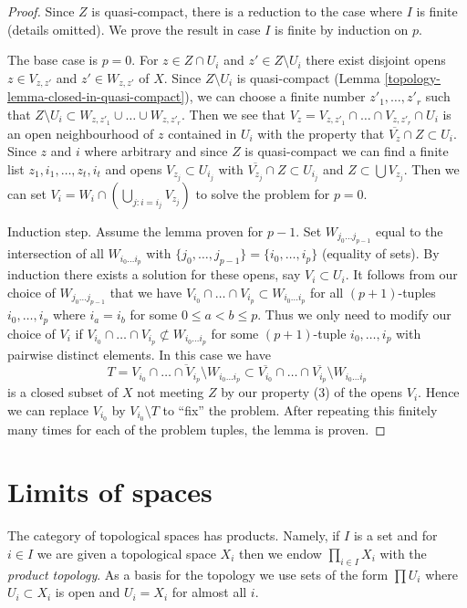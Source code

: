 \begin{proof}

Since $Z$ is quasi-compact, there is a reduction to the
case where $I$ is finite (details omitted).
We prove the result in case $I$ is finite by induction on $p$.

\medskip\noindent
The base case is $p = 0$.
For $z \in Z \cap U_i$ and $z' \in Z \setminus U_i$ there exist
disjoint opens $z \in V_{z, z'}$ and $z' \in W_{z, z'}$ of $X$.
Since $Z \setminus U_i$ is quasi-compact
(Lemma \ref{topology-lemma-closed-in-quasi-compact}),
we can choose a finite number $z'_1, \ldots, z'_r$ such that
$Z \setminus U_i \subset W_{z, z'_1} \cup \ldots \cup W_{z, z'_r}$.
Then we see that
$V_z = V_{z, z'_1} \cap \ldots \cap V_{z, z'_r} \cap U_i$
is an open neighbourhood of $z$ contained in $U_i$
with the property that $\overline{V_z} \cap Z \subset U_i$.
Since $z$ and $i$ where arbitrary and since $Z$ is quasi-compact
we can find a finite list $z_1, i_1, \ldots, z_t, i_t$
and opens $V_{z_j} \subset U_{i_j}$ with
$\overline{V_{z_j}} \cap Z \subset U_{i_j}$
and $Z \subset \bigcup V_{z_j}$.
Then we can set $V_i = W_i \cap (\bigcup_{j : i = i_j} V_{z_j})$
to solve the problem for $p = 0$.

\medskip\noindent
Induction step. Assume the lemma proven for $p - 1$.
Set $W_{j_0 \ldots j_{p - 1}}$ equal to the intersection of
all $W_{i_0 \ldots i_p}$ with
$\{j_0, \ldots, j_{p - 1}\} = \{i_0, \ldots, i_p\}$ (equality of sets).
By induction there exists a solution for these opens, say
$V_i \subset U_i$.
It follows from our choice of $W_{j_0 \ldots j_{p - 1}}$ that we have
$V_{i_0} \cap \ldots \cap V_{i_p} \subset W_{i_0 \ldots i_p}$
for all $(p + 1)$-tuples $i_0, \ldots, i_p$ where $i_a = i_b$ for
some $0 \leq a < b \leq p$.
Thus we only need to modify our choice of
$V_i$ if $V_{i_0} \cap \ldots \cap V_{i_p} \not \subset W_{i_0 \ldots i_p}$
for some $(p + 1)$-tuple $i_0, \ldots, i_p$ with pairwise distinct elements.
In this case we have
$$
T =
\overline{V_{i_0} \cap \ldots \cap V_{i_p} \setminus W_{i_0 \ldots i_p}}
\subset
\overline{V_{i_0}} \cap \ldots \cap \overline{V_{i_p}} \setminus
W_{i_0 \ldots i_p}
$$
is a closed subset of $X$ not meeting $Z$ by our property (3) of the
opens $V_i$. Hence we can replace $V_{i_0}$ by $V_{i_0} \setminus T$
to ``fix'' the problem. After repeating this finitely many times for each
of the problem tuples, the lemma is proven.
\end{proof}

\section{Limits of spaces}
\label{topology-section-limits}
The category of topological spaces has products. Namely, if $I$ is a set
and for $i \in I$ we are given a topological space $X_i$ then we endow
$\prod_{i \in I} X_i$ with the {\it product topology}. As a basis for
the topology we use sets of the form $\prod U_i$ where $U_i \subset X_i$
is open and $U_i = X_i$ for almost all $i$.

